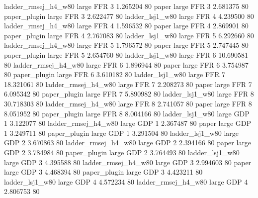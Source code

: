 ladder_rmsej_h4_w80      large      FFR                 3  1.265204 80
              paper      large      FFR                 3  2.681375 80
       paper_plugin      large      FFR                 3  2.622477 80
    ladder_lsj1_w80      large      FFR                 4  4.239500 80
ladder_rmsej_h4_w80      large      FFR                 4  1.596532 80
              paper      large      FFR                 4  2.869901 80
       paper_plugin      large      FFR                 4  2.767083 80
    ladder_lsj1_w80      large      FFR                 5  6.292660 80
ladder_rmsej_h4_w80      large      FFR                 5  1.796572 80
              paper      large      FFR                 5  2.747445 80
       paper_plugin      large      FFR                 5  2.654760 80
    ladder_lsj1_w80      large      FFR                 6 10.690581 80
ladder_rmsej_h4_w80      large      FFR                 6  1.896944 80
              paper      large      FFR                 6  3.754987 80
       paper_plugin      large      FFR                 6  3.610182 80
    ladder_lsj1_w80      large      FFR                 7 18.321061 80
ladder_rmsej_h4_w80      large      FFR                 7  2.208273 80
              paper      large      FFR                 7  6.095342 80
       paper_plugin      large      FFR                 7  5.890982 80
    ladder_lsj1_w80      large      FFR                 8 30.718303 80
ladder_rmsej_h4_w80      large      FFR                 8  2.741057 80
              paper      large      FFR                 8  8.051952 80
       paper_plugin      large      FFR                 8  8.004166 80
    ladder_lsj1_w80      large      GDP                 1  3.122077 80
ladder_rmsej_h4_w80      large      GDP                 1  2.367487 80
              paper      large      GDP                 1  3.249711 80
       paper_plugin      large      GDP                 1  3.291504 80
    ladder_lsj1_w80      large      GDP                 2  3.670863 80
ladder_rmsej_h4_w80      large      GDP                 2  2.394166 80
              paper      large      GDP                 2  3.784984 80
       paper_plugin      large      GDP                 2  3.764493 80
    ladder_lsj1_w80      large      GDP                 3  4.395588 80
ladder_rmsej_h4_w80      large      GDP                 3  2.994603 80
              paper      large      GDP                 3  4.468394 80
       paper_plugin      large      GDP                 3  4.423211 80
    ladder_lsj1_w80      large      GDP                 4  4.572234 80
ladder_rmsej_h4_w80      large      GDP                 4  2.806753 80

